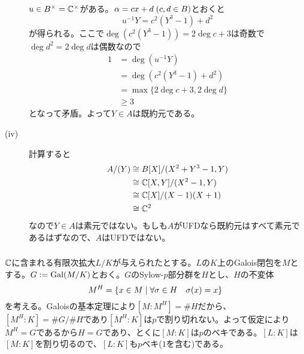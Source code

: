 \begin{sol}
\begin{description}
$u \in B^{\times} = {\mathbb C}^{\times}$がある。${\alpha} = c x + d \; (c,d \in B)$とおくと
\[
u^{-1} Y = c^2 (Y^3-1) + d^2
\]
が得られる。ここで$\deg(c^2(Y^3-1)) = 2 \deg c + 3$は奇数で$\deg d^2 = 2 \deg d$は偶数なので
\begin{align*}
  1 &= \deg (u^{-1}Y) \\
  &= \deg( c^2 (Y^3-1) + d^2 ) \\
  &= \max\{ 2 \deg c + 3,  2 \deg d \} \\
  &\geq 3
\end{align*}
となって矛盾。よって$Y \in A$は既約元である。
\item[(iv)] 計算すると
\begin{align*}
  A/(Y) &\cong B[X]/(X^2 + Y^3 -1, Y) \\
  &\cong {\mathbb C}[X,Y]/(X^2-1,Y) \\
  &\cong {\mathbb C}[X]/(X-1)(X+1) \\
  &\cong {\mathbb C}^2
\end{align*}
なので$Y \in A$は素元ではない。もしも$A$がUFDなら既約元はすべて素元であるはずなので、$A$はUFDではない。
  \end{description}
\end{sol}

\newpage


\subsubsection{}%
\begin{sol}
  ${\mathbb C}$に含まれる有限次拡大$L/K$が与えられたとする。$L$の$K$上のGalois閉包を$M$とする。$G:= \operatorname{Gal}(M/K)$とおく。$G$のSylow-$p$部分群を$H$とし、$H$の不変体
  \[
  M^H = \left\{ x \in M \mathrel{} \middle| \mathrel{} \forall {\sigma} \in H \quad {\sigma}(x) = x  \right\}
  \]
  を考える。Galoisの基本定理により$[M:M^H] = \# H$だから、$[M^H : K] = \# G / \# H$であり$[M^H : K]$は$p$で割り切れない。よって仮定により$M^H =G$であるから$H=G$であり、とくに$[M:K]$は$p$のベキである。$[L:K]$は$[M:K]$を割り切るので、$[L:K]$も$p$ベキ($1$を含む)である。
\end{sol}


\newpage


